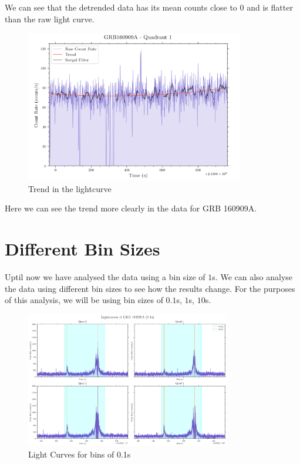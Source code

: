 \documentclass[11pt]{book} %
\begin{document}
We can see that the detrended data has its mean counts close to 0 and is flatter than the raw light curve.

\begin{figure}[H]
    \centering
    \includegraphics[width=0.85\textwidth]{Pictures/trend2.png}
    \caption{Trend in the lightcurve}
\end{figure}
Here we can see the trend more clearly in the data for GRB 160909A.
\newpage

\section{Different Bin Sizes}

Uptil now we have analysed the data using a bin size of $1$s. We can also analyse the data using different bin sizes to see how the results change. For the purposes of this analysis, we will be using bin sizes of $0.1$s, $1$s, $10$s.

\begin{figure}[H]
    \centering
    \includegraphics[width=0.8\textwidth]{Pictures/allquads01s.png}
    \caption{Light Curves for bins of 0.1s}
    \label{fig:smallbins}
\end{figure}
\end{document}
